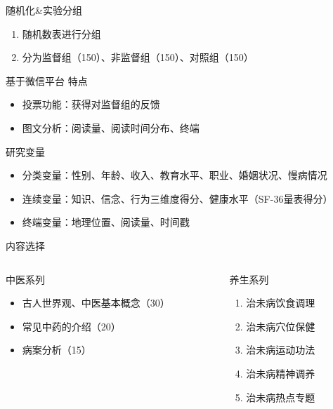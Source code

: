 \begin{frame}{随机化\&实验分组}
\begin{enumerate}
    \item 随机数表进行分组
    \item 分为监督组（150）、非监督组（150）、对照组（150）
\end{enumerate}

\begin{block}{基于微信平台 特点}
    \begin{itemize}
        \item 投票功能：获得对监督组的反馈
        \item 图文分析：阅读量、阅读时间分布、终端
        
    \end{itemize}
\end{block}
\end{frame}



\begin{frame}{研究变量}
    \begin{itemize}
        \item 分类变量：性别、年龄、收入、教育水平、职业、婚姻状况、慢病情况
        \item 连续变量：知识、信念、行为三维度得分、健康水平（SF-36量表得分）
        \item 终端变量：地理位置、阅读量、时间戳
    \end{itemize}
\end{frame}


\begin{frame}{内容选择}
\begin{columns}
    \begin{column}{0.5\textwidth}
    \begin{block}{中医系列}
        \begin{itemize}
            \item 古人世界观、中医基本概念（30）
            \item 常见中药的介绍（20）
            \item 病案分析（15）
        \end{itemize}
    \end{block}
\end{column}
\begin{column}{0.5\textwidth}
    \begin{block}{养生系列}
        \begin{enumerate}
            \item 治未病饮食调理
            \item 治未病穴位保健
            \item 治未病运动功法
            \item 治未病精神调养
            \item 治未病热点专题
        \end{enumerate}
    \end{block}
\end{column}
\end{columns}
\end{frame}

